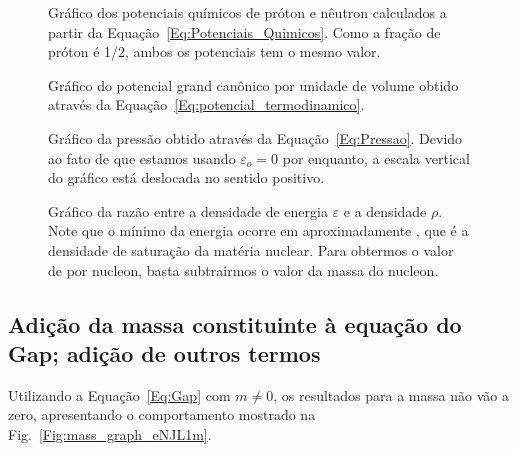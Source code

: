 \begin{figure}
	
	\caption{Gráfico dos potenciais químicos de próton e nêutron calculados a partir da Equação~\eqref{Eq:Potenciais_Quimicos}. Como a fração de próton é 1/2, ambos os potenciais tem o mesmo valor. \protect}
	\label{Fig:chemical_potential_graph}
\end{figure}

\begin{figure}
	
	\caption{Gráfico do potencial grand canônico por unidade de volume obtido através da Equação~\eqref{Eq:potencial_termodinamico}. \protect}
	\label{Fig:thermodynamic_potential_graph}
\end{figure}

\begin{figure}
	
	\caption{Gráfico da pressão obtido através da Equação~\eqref{Eq:Pressao}. Devido ao fato de que estamos usando $\varepsilon_o = 0$ por enquanto, a escala vertical do gráfico está deslocada no sentido positivo. \protect}
	\label{Fig:pressure_graph}
\end{figure}

\begin{figure}
	
	\caption{Gráfico da razão entre a densidade de energia $\varepsilon$ e a densidade $\rho$. Note que o mínimo da energia ocorre em aproximadamente , que é a densidade de saturação da matéria nuclear. Para obtermos o valor de  por nucleon, basta subtrairmos o valor da massa do nucleon. \protect}
	\label{Fig:energy_by_nucleon_graph}
\end{figure}

\FloatBarrier
\subsection{Adição da massa constituinte à equação do Gap; adição de outros termos}

Utilizando a Equação~\ref{Eq:Gap} com $m \neq 0$, os resultados para a massa não vão a zero, apresentando o comportamento mostrado na Fig.~\ref{Fig:mass_graph_eNJL1m}.

